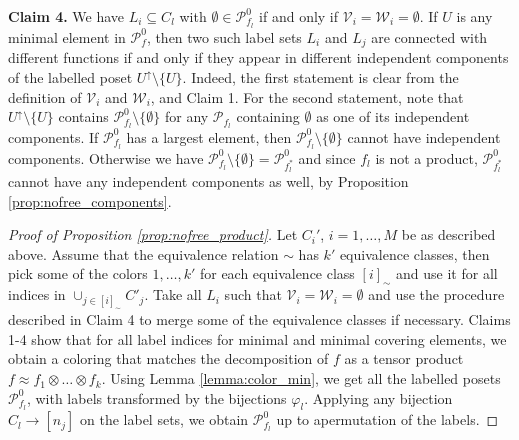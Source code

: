 \documentclass[12pt]{article}
\theoremstyle{definition}
\theoremstyle{remark}
\def\Pe{\mathcal P}
\begin{document}
\medskip 
\noindent
\textbf{Claim 4.} We have $L_i\subseteq C_l$
with $\emptyset \in \Pe_{f_l}^0$ if and only if  $\mathcal V_i=\mathcal W_i=\emptyset$. If
$U$ is any minimal element in $\Pe_f^0$, then two
such label sets $L_i$ and $L_j$ are connected with different functions  if and only if they appear
in different  independent components of the labelled poset $U^\uparrow\setminus \{U\}$.
Indeed, the first statement is clear from the definition of $\mathcal V_i$ and $\mathcal
W_i$, and Claim 1. For the second statement, note that $U^\uparrow\setminus \{U\}$
contains $\Pe_{f_l}^0\setminus\{\emptyset\}$ for any $\Pe_{f_l}$ containing $\emptyset$  as one of its independent
components. If $\Pe_{f_l}^0$ has a largest element, then $\Pe_{f_l}^0\setminus\{\emptyset\}$ cannot
have independent components. Otherwise we have $\Pe_{f_l}^0\setminus\{\emptyset\}=\Pe_{f_l^*}^0$ and since $f_l$ is not a product,
$\Pe_{f_l^*}^0$ cannot have any independent components as well, by Proposition
\ref{prop:nofree_components}. 

\begin{proof}[Proof of Proposition \ref{prop:nofree_product}] Let $C_i'$, $i=1,\dots,M$ be
as described above. Assume that the equivalence relation $\sim$ has $k'$ equivalence
classes, then pick some of the colors $1,\dots, k'$ for each equivalence class $[i]_\sim$ and use it
for all indices  in  $\cup_{j\in [i]_\sim} C'_j$. Take all $L_i$ such that  $\mathcal
V_i=\mathcal W_i=\emptyset$ and use the procedure described in Claim 4 to merge some of the equivalence
classes if necessary. Claims 1-4 show that for all label indices for minimal and minimal
covering elements, we obtain a coloring that matches the decomposition of $f$ as a tensor
product $f\approx f_1\otimes\dots\otimes f_k$. Using Lemma \ref{lemma:color_min}, we get
all the labelled posets $\Pe_{f_l}^0$, with labels transformed by the bijections
$\varphi_l$. Applying any bijection $C_l\to [n_j]$ on the label sets, we obtain
$\Pe_{f_l}^0$ up to apermutation of the labels.

\end{proof}
\end{document}
